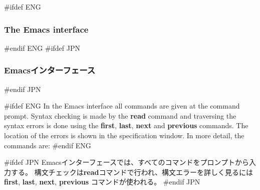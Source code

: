 \documentclass[\pformat,12pt]{article}
\begin{document}
#ifdef ENG
\subsubsection{The Emacs interface}
#endif ENG
#ifdef JPN
\subsubsection{Emacsインターフェース}
#endif JPN

#ifdef ENG
In the Emacs interface all commands are given at the command
prompt. Syntax checking is made by the \textbf{read} command and
traversing the syntax errors is done using the \textbf{first},
\textbf{last}, \textbf{next} and \textbf{previous} commands. The
location of the errors is shown in the specification
window. In more detail, the commands are:
#endif ENG

#ifdef JPN
Emacsインターフェースでは、すべてのコマンドをプロンプトから入力する。
構文チェックは\textbf{read}コマンドで行われ、構文エラーを詳しく見るには
\textbf{first}, \textbf{last}, \textbf{next}, \textbf{previous} コマンドが使われる。
#endif JPN
\end{document}
